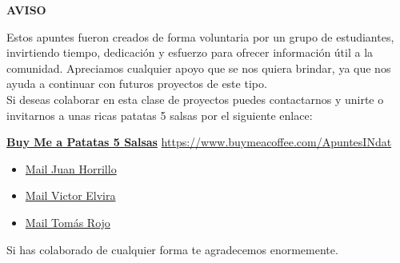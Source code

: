 \begin{center}
    \Huge \textbf{AVISO}
\end{center}

Estos apuntes fueron creados de forma voluntaria por un grupo de estudiantes, invirtiendo tiempo, dedicación y esfuerzo para ofrecer información útil a la comunidad. Apreciamos cualquier apoyo que se nos quiera brindar, ya que nos ayuda a continuar con futuros proyectos de este tipo. \\

Si deseas colaborar en esta clase de proyectos puedes contactarnos y unirte o invitarnos a unas ricas patatas 5 salsas por el siguiente enlace:

\vfil

\begin{center}
    \href{https://www.buymeacoffee.com/ApuntesINdat}{\LARGE \textbf{Buy Me a Patatas 5 Salsas}}
    \href{https://www.buymeacoffee.com/ApuntesINdat}{https://www.buymeacoffee.com/ApuntesINdat}
\end{center}

\begin{itemize}
    \item \href{mailto:juan.horrillo22@estudiantes.uva.es}{Mail Juan Horrillo}
    \item \href{mailto:victor.elvira22@estudiantes.uva.es}{Mail Victor Elvira}
    \item \href{mailto:tomas.rojo22@estudiantes.uva.es}{Mail Tomás Rojo}
\end{itemize}

\vfil

Si has colaborado de cualquier forma te agradecemos enormemente.